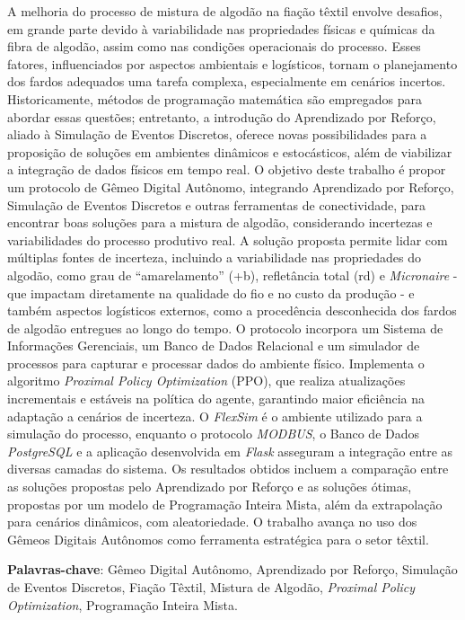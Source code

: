 \documentclass[
    12pt,                %
    openright,           %
    oneside,             %
    a4paper,             %
    english,             %
    spanish,             %
    brazil               %
]{ufscar}
\begin{document}
\setlength{\absparsep}{18pt} %
\begin{resumo}

A melhoria do processo de mistura de algodão na fiação têxtil envolve desafios, em grande parte devido à variabilidade nas propriedades físicas e químicas da fibra de algodão, assim como nas condições operacionais do processo. Esses fatores, influenciados por aspectos ambientais e logísticos, tornam o planejamento dos fardos adequados uma tarefa complexa, especialmente em cenários incertos. Historicamente, métodos de programação matemática são empregados para abordar essas questões; entretanto, a introdução do Aprendizado por Reforço, aliado à Simulação de Eventos Discretos, oferece novas possibilidades para a proposição de soluções em ambientes dinâmicos e estocásticos, além de viabilizar a integração de dados físicos em tempo real.
O objetivo deste trabalho é propor um protocolo de Gêmeo Digital Autônomo, integrando Aprendizado por Reforço, Simulação de Eventos Discretos e outras ferramentas de conectividade, para encontrar boas soluções para a mistura de algodão, considerando incertezas e variabilidades do processo produtivo real. A solução proposta permite lidar com múltiplas fontes de incerteza, incluindo a variabilidade nas propriedades do algodão, como grau de “amarelamento” (+b), refletância total (rd) e \textit{Micronaire} - que impactam diretamente na qualidade do fio e no custo da produção - e também aspectos logísticos externos, como a procedência desconhecida dos fardos de algodão entregues ao longo do tempo.
O protocolo incorpora um Sistema de Informações Gerenciais, um Banco de Dados Relacional e um simulador de processos para capturar e processar dados do ambiente físico. Implementa o algoritmo \textit{Proximal Policy Optimization} (PPO), que realiza atualizações incrementais e estáveis na política do agente, garantindo maior eficiência na adaptação a cenários de incerteza. O \textit{FlexSim} é o ambiente utilizado para a simulação do processo, enquanto o protocolo \textit{MODBUS}, o Banco de Dados \textit{PostgreSQL} e a aplicação desenvolvida em \textit{Flask} asseguram a integração entre as diversas camadas do sistema.
Os resultados obtidos incluem a comparação entre as soluções propostas pelo Aprendizado por Reforço e as soluções ótimas, propostas por um modelo de Programação Inteira Mista, além da extrapolação para cenários dinâmicos, com aleatoriedade. O trabalho avança no uso dos Gêmeos Digitais Autônomos como ferramenta estratégica para o setor têxtil.

\textbf{Palavras-chave}: Gêmeo Digital Autônomo, Aprendizado por Reforço, Simulação de Eventos Discretos, Fiação Têxtil, Mistura de Algodão, \textit{Proximal Policy Optimization}, Programação Inteira Mista.


\end{resumo}
\end{document}
